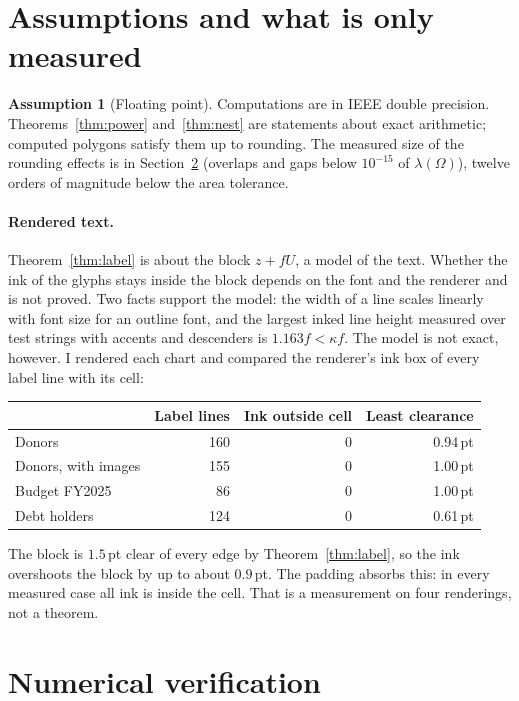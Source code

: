 \documentclass[11pt,a4paper]{article}
\theoremstyle{plain}
\theoremstyle{definition}
\newtheorem{assumption}[theorem]{Assumption}
\theoremstyle{remark}
\newcommand{\area}{\lambda}
\begin{document}
\section{Assumptions and what is only measured}\label{sec:assumptions}

\begin{assumption}[Floating point]\label{asm:float}
Computations are in IEEE double precision. Theorems~\ref{thm:power}
and~\ref{thm:nest} are statements about exact arithmetic; computed polygons
satisfy them up to rounding. The measured size of the rounding effects is in
Section~\ref{sec:numerics} (overlaps and gaps below $10^{-15}$ of
$\area(\Omega)$), twelve orders of magnitude below the area tolerance.
\end{assumption}

\paragraph{Rendered text.} Theorem~\ref{thm:label} is about the block
$z+fU$, a model of the text. Whether the ink of the glyphs stays inside the
block depends on the font and the renderer and is not proved. Two facts
support the model: the width of a line scales linearly with font size for an
outline font, and the largest inked line height measured over test strings
with accents and descenders is $1.163f<\kappa f$. The model is not exact,
however. I rendered each chart and compared the renderer's ink box of every
label line with its cell:

\begin{center}
\begin{tabular}{@{}lrrr@{}}
\toprule
 & Label lines & Ink outside cell & Least clearance \\
\midrule
Donors & 160 & 0 & 0.94\,pt \\
Donors, with images & 155 & 0 & 1.00\,pt \\
Budget FY2025 & 86 & 0 & 1.00\,pt \\
Debt holders & 124 & 0 & 0.61\,pt \\
\bottomrule
\end{tabular}
\end{center}

\noindent
The block is $1.5$\,pt clear of every edge by Theorem~\ref{thm:label}, so the
ink overshoots the block by up to about $0.9$\,pt. The padding absorbs this:
in every measured case all ink is inside the cell. That is a measurement on
four renderings, not a theorem.

\section{Numerical verification}\label{sec:numerics}
\end{document}
